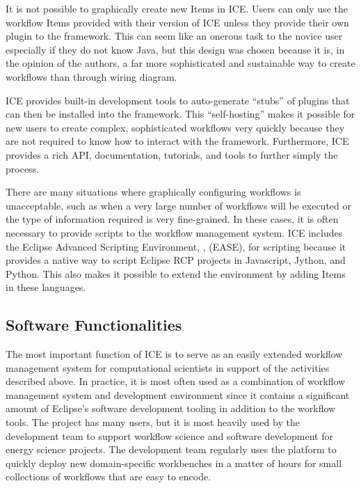 It is not possible to graphically create new Items in ICE. Users can
only use the workflow Items provided with their version of ICE unless
they provide their own plugin to the framework. This can seem like an
onerous task to the novice user especially if they do not know Java, but
this design was chosen because it is, in the opinion of the authors, a
far more sophisticated and sustainable way to create workflows than
through wiring diagram.

ICE provides built-in development tools to auto-generate ``stubs'' of
plugins that can then be installed into the framework. This
``self-hosting'' makes it possible for new users to create complex,
sophisticated workflows very quickly because they are not required to
know how to interact with the framework. Furthermore, ICE provides a
rich API, documentation, tutorials, and tools to further simply the
process.

There are many situations where graphically configuring workflows is
unacceptable, such as when a very large number of workflows will be
executed or the type of information required is very fine-grained. In
these cases, it is often necessary to provide scripts to the workflow
management system. ICE includes the Eclipse Advanced Scripting
Environment, \cite{pontesegger_eclipse_2015}, (EASE), for scripting because it
provides a native way to script Eclipse RCP projects in Javascript,
Jython, and Python. This also makes it possible to extend the
environment by adding Items in these languages.

\subsection{Software Functionalities}\label{software-functionalities}

The most important function of ICE is to serve as an easily extended
workflow management system for computational scientists in support of
the activities described above. In practice, it is most often used as a
combination of workflow management system and development environment
since it contains a significant amount of Eclipse's software development
tooling in addition to the workflow tools. The project has many users,
but it is most heavily used by the development team to support workflow
science and software development for energy science projects. The
development team regularly uses the platform to quickly deploy new
domain-specific workbenches in a matter of hours for small collections
of workflows that are easy to encode.


